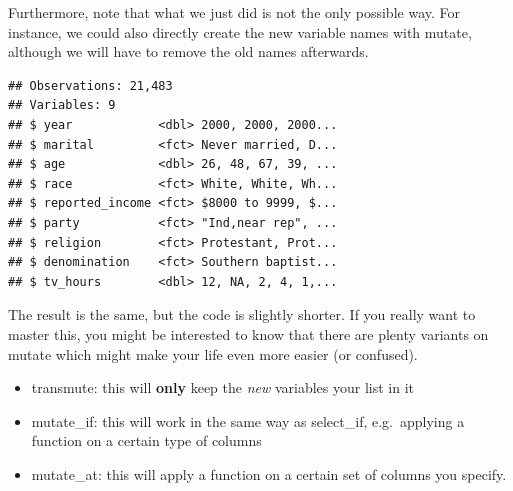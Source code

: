 \documentclass[]{tufte-book}
\newenvironment{Shaded}{}{}
\newcommand{\KeywordTok}[1]{\textcolor[rgb]{0.00,0.44,0.13}{\textbf{#1}}}
\newcommand{\DataTypeTok}[1]{\textcolor[rgb]{0.56,0.13,0.00}{#1}}
\newcommand{\StringTok}[1]{\textcolor[rgb]{0.25,0.44,0.63}{#1}}
\newcommand{\OperatorTok}[1]{\textcolor[rgb]{0.40,0.40,0.40}{#1}}
\newcommand{\NormalTok}[1]{#1}
\providecommand{\tightlist}{%
  \setlength{\itemsep}{0pt}\setlength{\parskip}{0pt}}
\begin{document}
Furthermore, note that what we just did is not the only possible way.
For instance, we could also directly create the new variable names with
mutate, although we will have to remove the old names afterwards.

\begin{Shaded}
\end{Shaded}

\begin{verbatim}
## Observations: 21,483
## Variables: 9
## $ year            <dbl> 2000, 2000, 2000...
## $ marital         <fct> Never married, D...
## $ age             <dbl> 26, 48, 67, 39, ...
## $ race            <fct> White, White, Wh...
## $ reported_income <fct> $8000 to 9999, $...
## $ party           <fct> "Ind,near rep", ...
## $ religion        <fct> Protestant, Prot...
## $ denomination    <fct> Southern baptist...
## $ tv_hours        <dbl> 12, NA, 2, 4, 1,...
\end{verbatim}

The result is the same, but the code is slightly shorter. If you really
want to master this, you might be interested to know that there are
plenty variants on mutate which might make your life even more easier
(or confused).

\begin{itemize}
\tightlist
\item
  transmute: this will \textbf{only} keep the \emph{new} variables your
  list in it
\item
  mutate\_if: this will work in the same way as select\_if,
  e.g.~applying a function on a certain type of columns
\item
  mutate\_at: this will apply a function on a certain set of columns you
  specify.
\end{itemize}
\end{document}
